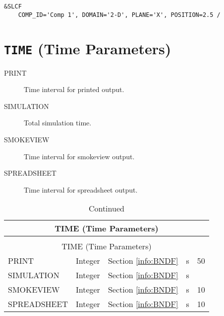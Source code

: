 \begin{lstlisting}
&SLCF 
	COMP_ID='Comp 1', DOMAIN='2-D', PLANE='X', POSITION=2.5 /
\end{lstlisting}

\vspace{\baselineskip}


\section{\texorpdfstring{{\tt TIME}}{TIME} (Time Parameters)}

\begin{adjustwidth}{1cm}{0cm}
\begin{description}
  \item[PRINT] Time interval for printed output.
  \item[SIMULATION] Total simulation time.
  \item[SMOKEVIEW] Time interval for smokeview output.
  \item[SPREADSHEET] Time interval for spreadsheet output.
\end{description}
\end{adjustwidth}

\vspace{\baselineskip}

\begin{longtable}{@{\extracolsep{\fill}}|l|l|l|l|l|}
\caption[Boundary file parameters ({\ct TIME} namelist group)]{For more information see Section~\ref{info:BNDF}.}
\label{tbl:TIME} \\
\hline
\multicolumn{5}{|c|}{{\ct TIME} (Time Parameters)} \\
\hline \hline
\endfirsthead
\caption[]{Continued} \\
\hline
\multicolumn{5}{|c|}{{\ct TIME} (Time Parameters)} \\
\hline \hline
\endhead
{\ct PRINT}             & Integer   & Section \ref{info:BNDF}                 & s         & 50              \\ \hline
{\ct SIMULATION}        & Integer   & Section \ref{info:BNDF}                 & s         &                 \\ \hline
{\ct SMOKEVIEW}         & Integer   & Section \ref{info:BNDF}                 & s         & 10              \\ \hline
{\ct SPREADSHEET}       & Integer   & Section \ref{info:BNDF}                 & s         & 10              \\ \hline
\end{longtable}

